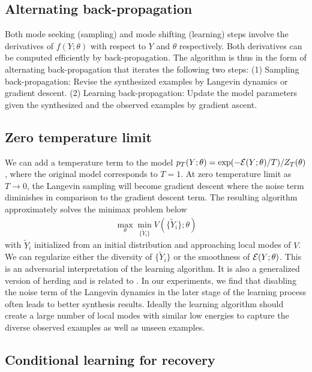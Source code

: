 \documentclass[10pt,twocolumn,letterpaper]{article}
\def\tY{\tilde{Y}}
\begin{document}
  \subsection{Alternating back-propagation} 

Both mode seeking (sampling) and mode shifting (learning) steps involve the derivatives of $f(Y;\theta)$ with respect to $Y$ and $\theta$ respectively. Both derivatives can be computed efficiently by back-propagation. The algorithm is thus in the form of alternating back-propagation that iterates the following two steps: (1) Sampling back-propagation: Revise the synthesized examples by Langevin dynamics or gradient descent.
(2) Learning back-propagation: Update the model parameters
given the synthesized and the observed examples by gradient ascent. 

\subsection{Zero temperature limit} 


We can add a temperature term to the model $p_T(Y; \theta) = \exp(- {\cal E}(Y; \theta)/T)/Z_T(\theta)$, where the original model corresponds to $T = 1$. At zero temperature limit as $T \rightarrow 0$, the Langevin sampling will become gradient descent where the noise term diminishes in comparison to the gradient descent term. The resulting algorithm approximately solves the minimax problem below
  \begin{eqnarray} 
\max_{\theta} \min_{\{\tY_i\}}  V(\{\tY_i\}; \theta)  \label{eq:minimax}
\end{eqnarray}
with $\tY_i$ initialized from an initial distribution and approaching local modes of $V$.  We can regularize either the diversity of $\{\tY_i\}$ or the smoothness of ${\cal E}(Y; \theta)$.  This is an adversarial interpretation of the learning algorithm. It is also a generalized version of herding \cite{welling2009herding} and is related to \cite{arjovsky2017wasserstein}. In our experiments, we find that disabling the noise term of the Langevin dynamics in the later stage of the learning process often leads to better synthesis results.  Ideally the learning algorithm should create a large number of local modes with similar low energies to capture the diverse observed examples as well as unseen examples. 


\subsection{Conditional learning for recovery}
\end{document}
